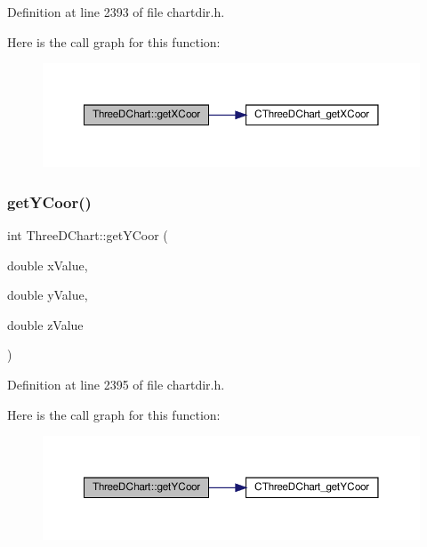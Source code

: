 Definition at line 2393 of file chartdir.\+h.

Here is the call graph for this function\+:
\nopagebreak
\begin{figure}[H]
\begin{center}
\leavevmode
\includegraphics[width=350pt]{class_three_d_chart_a816f5ea854803cabe8d6e5f1043226fb_cgraph}
\end{center}
\end{figure}
\mbox{\label{class_three_d_chart_a3ce077296571d861d9124d59dd0459b0}} 
\subsubsection{\texorpdfstring{get\+Y\+Coor()}{getYCoor()}}
{\footnotesize\ttfamily int Three\+D\+Chart\+::get\+Y\+Coor (\begin{DoxyParamCaption}\item[{double}]{x\+Value,  }\item[{double}]{y\+Value,  }\item[{double}]{z\+Value }\end{DoxyParamCaption})\hspace{0.3cm}{\ttfamily [inline]}}



Definition at line 2395 of file chartdir.\+h.

Here is the call graph for this function\+:
\nopagebreak
\begin{figure}[H]
\begin{center}
\leavevmode
\includegraphics[width=350pt]{class_three_d_chart_a3ce077296571d861d9124d59dd0459b0_cgraph}
\end{center}
\end{figure}
\mbox{\label{class_three_d_chart_a5ba1408237d21a7d894d212d4a2ca857}} 
